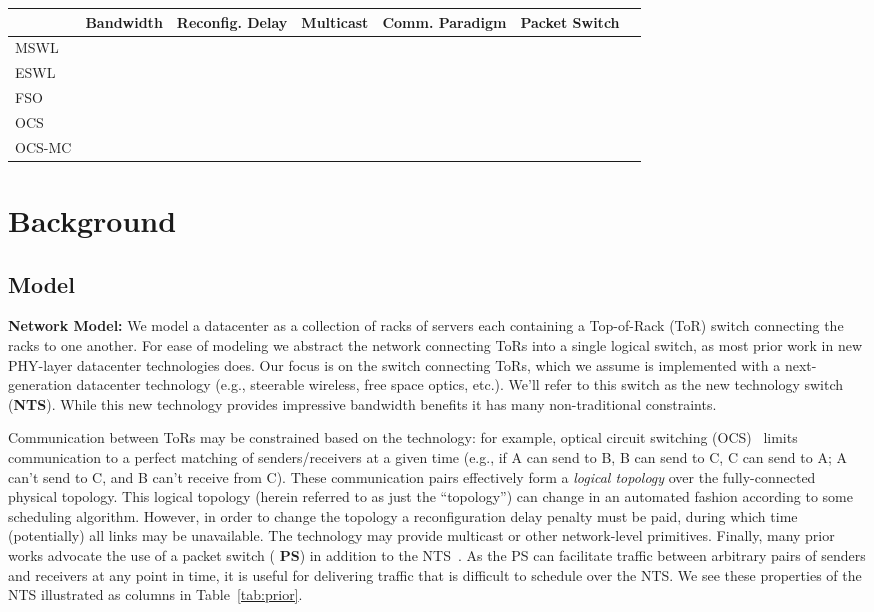 \begin{figure*}[t]
  \centering
  \begin{tabular}{| l | c | c | c | c | c | c |}
    \toprule
    & Bandwidth & Reconfig. Delay & Multicast & Comm. Paradigm & Packet Switch\\
    \midrule
    MSWL & & & & &\\
    ESWL & & & & &\\
    FSO & & & & &\\
    OCS & & & & &\\
    OCS-MC & & & & &\\
    \bottomrule
  \end{tabular}
  \caption{Examination of prior work.}
  \label{tab:prior}
\end{figure*}

\newpage\phantom{t}
\newpage



\section{Background}
\label{sec:background}

\subsection{Model}
\label{sec:model}

{\bf Network Model:} We model a datacenter as a collection of racks of servers
each containing a Top-of-Rack (ToR) switch connecting the racks to one
another. For ease of modeling we abstract the network connecting ToRs into a
single logical switch, as most prior work in new PHY-layer datacenter
technologies does. Our focus is on the switch connecting ToRs, which we assume
is implemented with a next-generation datacenter technology (e.g., steerable
wireless, free space optics, etc.). We'll refer to this switch as the new
technology switch ({\bf NTS}). While this new technology provides impressive
bandwidth benefits it has many non-traditional constraints.

Communication between ToRs may be constrained based on the technology: for
example, optical circuit switching (OCS)~\cite{TODO} limits communication to a
perfect matching of senders/receivers at a given time (e.g., if A can send to B,
B can send to C, C can send to A; A can't send to C, and B can't receive from
C). These communication pairs effectively form a \emph{logical topology} over
the fully-connected physical topology. This logical topology (herein referred to
as just the ``topology'') can change in an automated fashion according to some
scheduling algorithm. However, in order to change the topology a reconfiguration
delay penalty must be paid, during which time (potentially) all links may be
unavailable. The technology may provide multicast or other network-level
primitives. Finally, many prior works advocate the use of a packet switch ({\bf
  PS}) in addition to the NTS~\cite{TODO}. As the PS can facilitate traffic
between arbitrary pairs of senders and receivers at any point in time, it is
useful for delivering traffic that is difficult to schedule over the NTS. We see
these properties of the NTS illustrated as columns in Table~\ref{tab:prior}.

